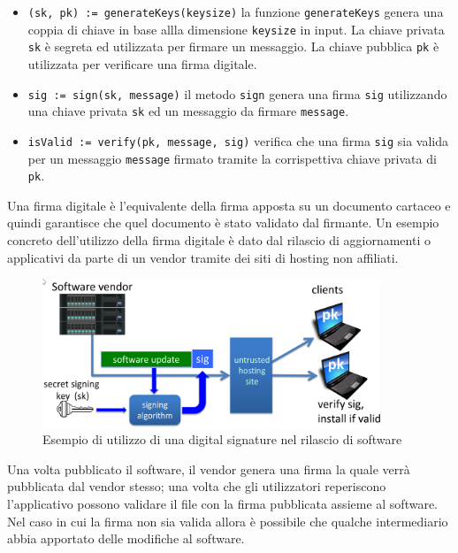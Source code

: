\begin{itemize}
    \item \texttt{(sk, pk) := generateKeys(keysize)} la funzione \texttt{generateKeys} genera una coppia di chiave in base allla dimensione \texttt{keysize} in input. La chiave privata \texttt{sk} è segreta ed utilizzata per firmare un messaggio. La chiave pubblica \texttt{pk} è utilizzata per verificare una firma digitale.
    \item \texttt{sig := sign(sk, message)} il metodo \texttt{sign} genera una firma \texttt{sig} utilizzando una chiave privata \texttt{sk} ed un messaggio da firmare \texttt{message}.
    \item \texttt{isValid := verify(pk, message, sig)} verifica che una firma \texttt{sig} sia valida per un messaggio \texttt{message} firmato tramite la corrispettiva chiave privata di \texttt{pk}.
\end{itemize}
Una firma digitale è l'equivalente della firma apposta su un documento cartaceo e quindi garantisce che quel documento è stato validato dal firmante. Un esempio concreto dell'utilizzo della firma digitale è dato dal rilascio di aggiornamenti o applicativi da parte di un vendor tramite dei siti di hosting non affiliati.
\begin{figure}[H]
    \centering
    \includegraphics[width=0.9\textwidth]{images/digitalsignature.png}
    \caption{Esempio di utilizzo di una digital signature nel rilascio di software}
\end{figure}
Una volta pubblicato il software, il vendor genera una firma la quale verrà pubblicata dal vendor stesso; una volta che gli utilizzatori reperiscono l'applicativo possono validare il file con la firma pubblicata assieme al software. Nel caso in cui la firma non sia valida allora è possibile che qualche intermediario abbia apportato delle modifiche al software.\newline\newline
